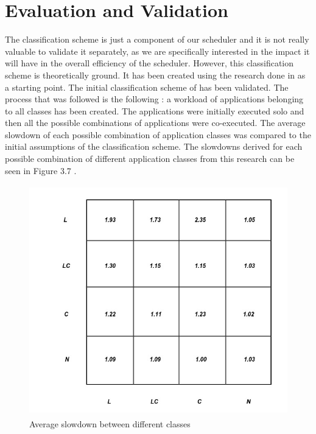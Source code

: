 \documentclass[diploma]{Styles/softlab-thesis}
\begin{document}
\section{Evaluation and Validation}

The classification scheme is just a component of our scheduler and it is not really valuable to validate it separately, as we are specifically interested in the impact it will have in the overall efficiency of the scheduler. However, this classification scheme is theoretically ground. It has been created using the research done in \cite{reference1} as a starting point. The initial classification scheme of \cite{reference1} has been validated. The process that was followed is the following : a workload of applications belonging to all classes has been created. The applications were initially executed solo and then all the possible combinations of applications were co-executed. The average slowdown of each possible combination of application classes was compared to the initial assumptions of the classification scheme. The slowdowns derived for each possible combination of different application classes from this research can be seen in Figure 3.7 .\\

\begin{figure}[ht!]
\begin{center}
\includegraphics[width=130mm, height=100mm]{images/interference.jpg}
\caption{Average slowdown between different classes \label{overflow}}
\end{center}
\end{figure}
\end{document}
